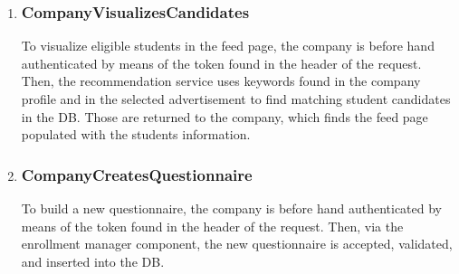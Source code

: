 \begin{enumerate}[label=\textbf{RV\arabic* -}]
\item \subsubsection{CompanyVisualizesCandidates}

To visualize eligible students in the feed page, the company is before hand authenticated by means of the token found in the header of the request.
Then, the recommendation service uses keywords found in the company profile and in the selected advertisement to find matching student candidates in the DB.
Those are returned to the company, which finds the feed page populated with the students information.

\begin{figure}[H]
    \centering
\end{figure}

\item \subsubsection{CompanyCreatesQuestionnaire}

To build a new questionnaire, the company is before hand authenticated by means of the token found in the header of the request.
Then, via the enrollment manager component, the new questionnaire is accepted, validated, and inserted into the DB.

\begin{figure}[H]
    \centering
\end{figure}


\end{enumerate}
